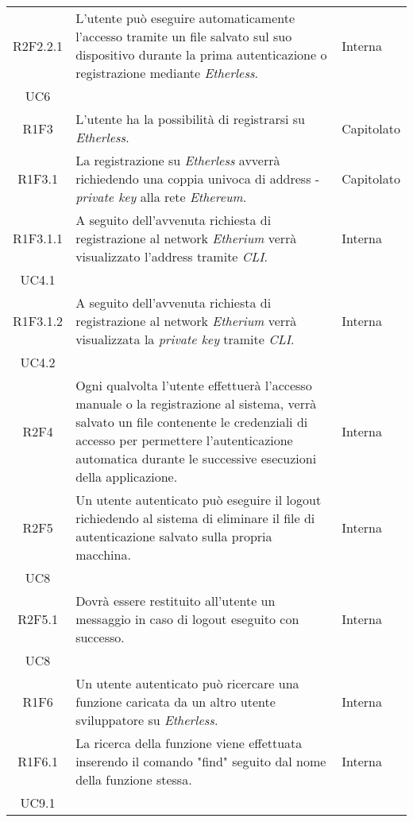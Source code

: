 \begin{longtable}{|c|p{8cm}|C{2cm}|}
	R2F2.2.1 &  L'utente può eseguire automaticamente l'accesso tramite un file salvato sul suo dispositivo durante la prima autenticazione o registrazione mediante \textit{Etherless}.  & \centering Interna \\ UC6 \tabularnewline

	R1F3 &  L'utente ha la possibilità di registrarsi su \textit{Etherless}.  & Capitolato \\

	R1F3.1 &  La registrazione su \textit{Etherless} avverrà richiedendo una coppia univoca di address - \textit{private key\glo} alla rete \textit{Ethereum\glos}.  & Capitolato \\

	R1F3.1.1 &  A seguito dell'avvenuta richiesta di registrazione al network \textit{Etherium\glo} verrà visualizzato l'address tramite \textit{CLI\glos}.  & \centering Interna \\ UC4.1 \tabularnewline

	R1F3.1.2 &  A seguito dell'avvenuta richiesta di registrazione al network \textit{Etherium\glo} verrà visualizzata la \textit{private key\glo} tramite \textit{CLI\glos}.  & \centering Interna \\ UC4.2 \tabularnewline

	R2F4 &  Ogni qualvolta l'utente effettuerà l'accesso manuale o la registrazione al sistema, verrà salvato un file contenente le credenziali di accesso per permettere l'autenticazione automatica durante le successive esecuzioni della applicazione.  & Interna \\

	R2F5 &  Un utente autenticato può eseguire il logout richiedendo al sistema di eliminare il file di autenticazione salvato sulla propria macchina.  & \centering Interna \\ UC8 \tabularnewline

	R2F5.1 &  Dovrà essere restituito all'utente un messaggio in caso di logout eseguito con successo.  & \centering Interna \\ UC8 \tabularnewline

	R1F6 &  Un utente autenticato può ricercare una funzione caricata da un altro utente sviluppatore su \textit{Etherless}.  & Interna \\

	R1F6.1 &  La ricerca della funzione viene effettuata inserendo il comando "find" seguito dal nome della funzione stessa. & \centering Interna \\ UC9.1 \tabularnewline


\end{longtable}
